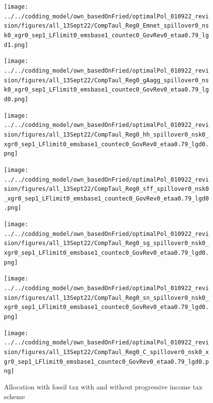 \begin{figure}[h!!]
	\centering
	\caption{Allocation with fossil tax with and without progressive income tax scheme}\label{fig:AlloTAuf}
	\begin{minipage}[]{0.32\textwidth}
		\texttt{[image: ../../codding\_model/own\_basedOnFried/optimalPol\_010922\_revision/figures/all\_13Sept22/CompTaul\_Reg0\_Emnet\_spillover0\_nsk0\_xgr0\_sep1\_LFlimit0\_emsbase1\_countec0\_GovRev0\_etaa0.79\_lgd1.png]}
	\end{minipage}	
	\begin{minipage}[]{0.32\textwidth}
		\texttt{[image: ../../codding\_model/own\_basedOnFried/optimalPol\_010922\_revision/figures/all\_13Sept22/CompTaul\_Reg0\_gAagg\_spillover0\_nsk0\_xgr0\_sep1\_LFlimit0\_emsbase1\_countec0\_GovRev0\_etaa0.79\_lgd0.png]}
	\end{minipage}	
	\begin{minipage}[]{0.32\textwidth}
		\texttt{[image: ../../codding\_model/own\_basedOnFried/optimalPol\_010922\_revision/figures/all\_13Sept22/CompTaul\_Reg0\_hh\_spillover0\_nsk0\_xgr0\_sep1\_LFlimit0\_emsbase1\_countec0\_GovRev0\_etaa0.79\_lgd0.png]}
	\end{minipage}	
	\begin{minipage}[]{0.32\textwidth}
		\texttt{[image: ../../codding\_model/own\_basedOnFried/optimalPol\_010922\_revision/figures/all\_13Sept22/CompTaul\_Reg0\_sff\_spillover0\_nsk0\_xgr0\_sep1\_LFlimit0\_emsbase1\_countec0\_GovRev0\_etaa0.79\_lgd0.png]}
	\end{minipage}		
	\begin{minipage}[]{0.32\textwidth}
		\texttt{[image: ../../codding\_model/own\_basedOnFried/optimalPol\_010922\_revision/figures/all\_13Sept22/CompTaul\_Reg0\_sg\_spillover0\_nsk0\_xgr0\_sep1\_LFlimit0\_emsbase1\_countec0\_GovRev0\_etaa0.79\_lgd0.png]}
	\end{minipage}	
	\begin{minipage}[]{0.32\textwidth}
		\texttt{[image: ../../codding\_model/own\_basedOnFried/optimalPol\_010922\_revision/figures/all\_13Sept22/CompTaul\_Reg0\_sn\_spillover0\_nsk0\_xgr0\_sep1\_LFlimit0\_emsbase1\_countec0\_GovRev0\_etaa0.79\_lgd0.png]}
	\end{minipage}		
	\begin{minipage}[]{0.32\textwidth}
		\texttt{[image: ../../codding\_model/own\_basedOnFried/optimalPol\_010922\_revision/figures/all\_13Sept22/CompTaul\_Reg0\_C\_spillover0\_nsk0\_xgr0\_sep1\_LFlimit0\_emsbase1\_countec0\_GovRev0\_etaa0.79\_lgd0.png]}
	\end{minipage}	
\end{figure}

